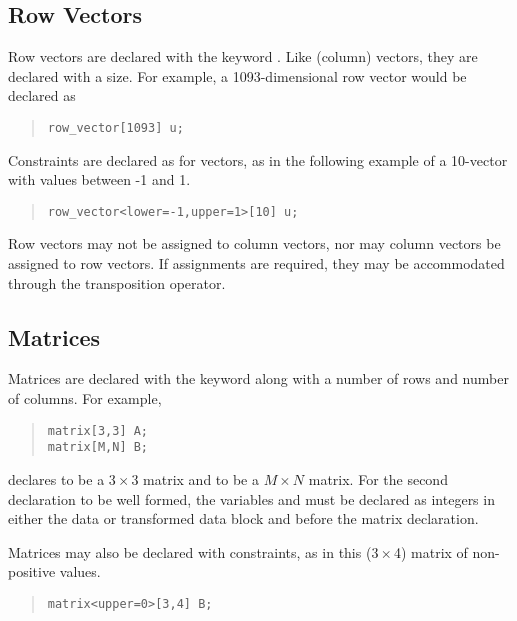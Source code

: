 \subsection{Row Vectors}

Row vectors are declared with the keyword .
Like (column) vectors, they are declared with a size.  For example,
a 1093-dimensional row vector  would be declared as
%
\begin{quote}
\begin{Verbatim}[fontsize=\small]
row_vector[1093] u;
\end{Verbatim}
\end{quote}
%
Constraints are declared as for vectors, as in the following example
of a 10-vector with values between -1 and 1.
\begin{quote}
\begin{Verbatim}[fontsize=\small]
row_vector<lower=-1,upper=1>[10] u;
\end{Verbatim}
\end{quote}
%

Row vectors may not be assigned to column vectors, nor may column
vectors be assigned to row vectors.  If assignments are required, they
may be accommodated through the transposition operator.

\subsection{Matrices}

Matrices are declared with the keyword  along with a
number of rows and number of columns.  For example, 
%
\begin{quote}
\begin{Verbatim}  
matrix[3,3] A;  
matrix[M,N] B;
\end{Verbatim}
\end{quote}
%  
declares  to be a $3 \times 3$ matrix and  to be a $M
\times N$ matrix.  For the second declaration to be well formed, the
variables  and  must be declared as integers in either
the data or transformed data block and before the matrix declaration.

Matrices may also be declared with constraints, as in this ($3 \times $4)
matrix of non-positive values.
%
\begin{quote}
\begin{Verbatim}  
matrix<upper=0>[3,4] B;
\end{Verbatim}
\end{quote}
%  


